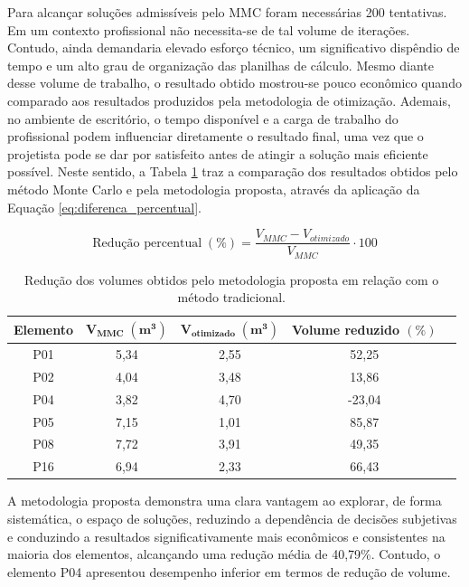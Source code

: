 Para alcançar soluções admissíveis pelo MMC foram necessárias 200 tentativas. Em um contexto profissional não necessita-se de tal volume de iterações. Contudo, ainda demandaria elevado esforço técnico, um significativo dispêndio de tempo e um alto grau de organização das planilhas de cálculo. Mesmo diante desse volume de trabalho, o resultado obtido mostrou-se pouco econômico quando comparado aos resultados produzidos pela metodologia de otimização. Ademais, no ambiente de escritório, o tempo disponível e a carga de trabalho do profissional podem influenciar diretamente o resultado final, uma vez que o projetista pode se dar por satisfeito antes de atingir a solução mais eficiente possível. Neste sentido, a Tabela \ref{tab:volume_final} traz a comparação dos resultados obtidos pelo método Monte Carlo e pela metodologia proposta, através da aplicação  da Equação \eqref{eq:diferenca_percentual}.

\begin{equation}
    \label{eq:diferenca_percentual}
    \text{Redução percentual}\;(\%) = \frac{V_{MMC} - V_{otimizado}}{V_{MMC}} \cdot 100
\end{equation}

\begin{table}[H]
\centering
\caption{Redução dos volumes obtidos pelo metodologia proposta em relação com o método tradicional.}
\label{tab:volume_final}
\begin{tabular}{ccccc}
\toprule
\textbf{Elemento} &
$\mathbf{V_{MMC}\;(m^3)}$ &
$\mathbf{V_{otimizado}\;(m^3)}$ &
\textbf{Volume reduzido} $(\%)$ \\
\midrule
P01 & 5,34 & 2,55 & 52,25 \\
P02 & 4,04 & 3,48 & 13,86 \\
P04 & 3,82 & 4,70 &  -23,04\\
P05 &  7,15 & 1,01 &  85,87\\
P08 & 7,72 & 3,91 &  49,35 \\
P16 & 6,94 & 2,33 & 66,43 \\
\bottomrule
\end{tabular}
\end{table}

A metodologia proposta demonstra uma clara vantagem ao explorar, de forma sistemática, o espaço de soluções, reduzindo a dependência de decisões subjetivas e conduzindo a resultados significativamente mais econômicos e consistentes na maioria dos elementos, alcançando uma redução média de 40,79\%. Contudo, o elemento P04 apresentou desempenho inferior em termos de redução de volume.